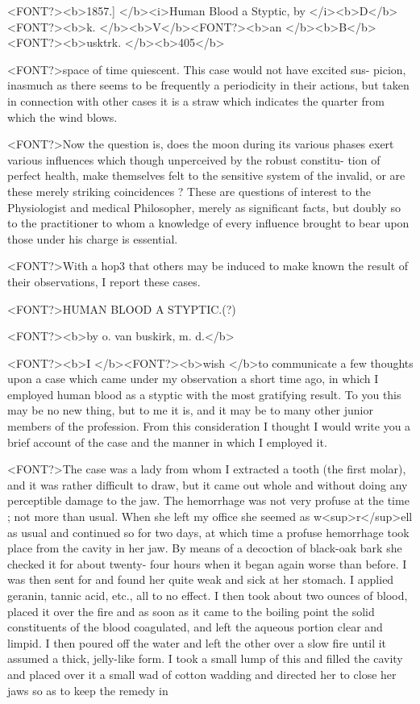 <FONT?><b>1857.]     </b><i>Human Blood a Styptic, by </i><b>D</b><FONT?><b>k. </b><b>V</b><FONT?><b>an </b><b>B</b><FONT?><b>usktrk. </b><b>405</b>

<FONT?>space of time quiescent. This case would not have excited sus-
picion, inasmuch as there seems to be frequently a periodicity in their
actions, but taken in connection with other cases it is a straw which
indicates the quarter from which the wind blows.

<FONT?>Now the question is, does the moon during its various phases exert
various influences which though unperceived by the robust constitu-
tion of perfect health, make themselves felt to the sensitive system
of the invalid, or are these merely striking coincidences ? These are
questions of interest to the Physiologist and medical Philosopher,
merely as significant facts, but doubly so to the practitioner to whom
a knowledge of every influence brought to bear upon those under his
charge is essential.

<FONT?>With a hop3 that others may be induced to make known the result
of their observations, I report these cases.

<FONT?>HUMAN BLOOD A STYPTIC.(?)

<FONT?><b>by o. van buskirk, m. d.</b>

<FONT?><b>I </b><FONT?><b>wish </b>to communicate a few thoughts upon a case which came under
my observation a short time ago, in which I employed human blood as
a styptic with the most gratifying result. To you this may be no new
thing, but to me it is, and it may be to many other junior members of
the profession. From this consideration I thought I would write you
a brief account of the case and the manner in which I employed it.

<FONT?>The case was a lady from whom I extracted a tooth (the first molar),
and it was rather difficult to draw, but it came out whole and without
doing any perceptible damage to the jaw. The hemorrhage was not
very profuse at the time ; not more than usual. When she left my office
she seemed as w<sup>r</sup>ell as usual and continued so for two days, at which
time a profuse hemorrhage took place from the cavity in her jaw. By
means of a decoction of black-oak bark she checked it for about twenty-
four hours when it began again worse than before. I was then sent for
and found her quite weak and sick at her stomach. I applied geranin,
tannic acid, etc., all to no effect. I then took about two ounces of blood,
placed it over the fire and as soon as it came to the boiling point the
solid constituents of the blood coagulated, and left the aqueous portion
clear and limpid. I then poured off the water and left the other over
a slow fire until it assumed a thick, jelly-like form. I took a small lump
of this and filled the cavity and placed over it a small wad of cotton
wadding and directed her to close her jaws so as to keep the remedy in\endinput
